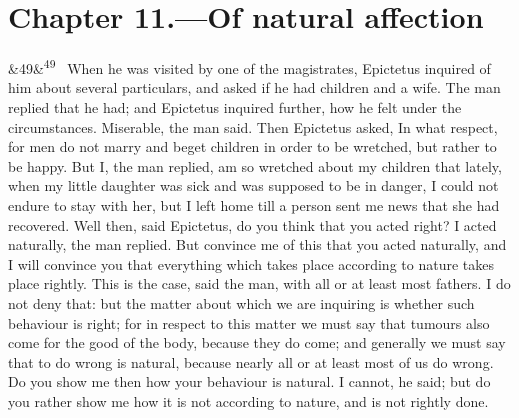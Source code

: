 \documentclass[12pt]{article}
\newcommand{\para}[1][]{\par\noindent\ifx&#1&\else\textsuperscript{\footnotesize #1}~\fi}
\begin{document}
\section*{Chapter 11.---Of natural affection}

\para[49] When he was visited by one of the magistrates, Epictetus inquired of him about several particulars, and asked if he had children and a wife. The man replied that he had; and Epictetus inquired further, how he felt under the circumstances. Miserable, the man said. Then Epictetus asked, In what respect, for men do not marry and beget children in order to be wretched, but rather to be happy. But I, the man replied, am so wretched about my children that lately, when my little daughter was sick and was supposed to be in danger, I could not endure to stay with her, but I left home till a person sent me news that she had recovered. Well then, said Epictetus, do you think that you acted right? I acted naturally, the man replied. But convince me of this that you acted naturally, and I will convince you that everything which takes place according to nature takes place rightly. This is the case, said the man, with all or at least most fathers. I do not deny that: but the matter about which we are inquiring is whether such behaviour is right; for in respect to this matter we must say that tumours also come for the good of the body, because they do come; and generally we must say that to do wrong is natural, because nearly all or at least most of us do wrong. Do you show me then how your behaviour is natural. I cannot, he said; but do you rather show me how it is not according to nature, and is not rightly done.
\end{document}

